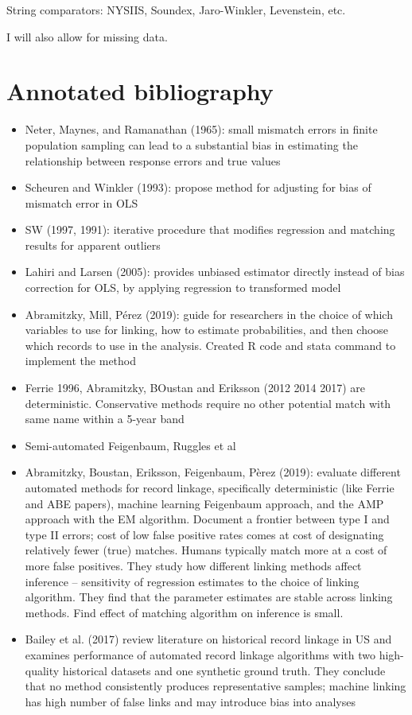 \documentclass[12pt]{article}
\begin{document}
String comparators: NYSIIS, Soundex, Jaro-Winkler, Levenstein, etc. 

I will also allow for missing data. 

\section{Annotated bibliography}
\begin{itemize}
\item Neter, Maynes, and Ramanathan (1965): small mismatch errors in finite population sampling can lead to a substantial bias in estimating the relationship between response errors and true values
\item Scheuren and Winkler (1993): propose method for adjusting for bias of mismatch error in OLS
\item SW (1997, 1991): iterative procedure that modifies regression and matching results for apparent outliers 
\item Lahiri and Larsen (2005):   provides unbiased estimator directly instead of bias correction for OLS, by applying regression to transformed model 
\item Abramitzky, Mill, P\'erez (2019): guide for researchers in the choice of which variables to use for linking, how to estimate probabilities, and then choose which records to use in the analysis.  Created R code and stata command to implement the method
\item Ferrie 1996, Abramitzky, BOustan and Eriksson (2012 2014 2017) are deterministic.  Conservative methods require no other potential match with same name within a 5-year band
\item Semi-automated Feigenbaum, Ruggles et al 
\item Abramitzky, Boustan, Eriksson, Feigenbaum, P\`erez (2019): evaluate different automated methods for record linkage, specifically deterministic (like Ferrie and ABE papers), machine learning Feigenbaum approach, and the AMP approach with the EM algorithm.  Document a frontier between type I and type II errors; cost of low false positive rates comes at cost of designating relatively fewer (true) matches.  Humans typically match more at a cost of more false positives.  They study how different linking methods affect inference -- sensitivity of regression estimates to the choice of linking algorithm.  They find that the parameter estimates are stable across linking methods.  Find effect of matching algorithm on inference is small. 
\item Bailey et al. (2017) review literature on historical record linkage in US and examines performance of automated record linkage algorithms with two high-quality historical datasets and one synthetic ground truth.  They conclude that no method consistently produces representative samples; machine linking has high number of false links and may introduce bias into analyses

\end{itemize}
\end{document}
